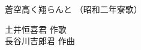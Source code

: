 \documentclass[10pt,b5j]{tarticle} %
\begin{document}
\begin{minipage}[c]{0.7\hsize} %
    \begin{center}
        {\LARGE
            蒼空高く翔らんと %
        }
        {\small 
            （昭和二年寮歌） %
        }
    \end{center}
\end{minipage}
\begin{minipage}[c]{0.3\hsize} %
    \begin{flushright} %
        土井恒喜君 作歌\\長谷川吉郎君 作曲 %
    \end{flushright}
\end{minipage}
\end{document}
